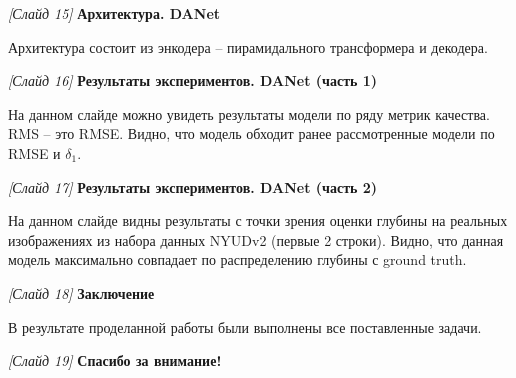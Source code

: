 \documentclass[a4paper, 14pt]{extarticle}
\begin{document}
	
	\textit{[Слайд 15]} \textbf{Архитектура. DANet}
	
	Архитектура состоит из энкодера -- пирамидального трансформера и декодера.
	\bigskip
	
	
	\textit{[Слайд 16]} \textbf{Результаты экспериментов. DANet (часть 1)}
	
	На данном слайде можно увидеть результаты модели по ряду метрик качества. RMS -- это RMSE. Видно, что модель обходит ранее рассмотренные модели по RMSE и $\delta_1$.
	\bigskip
	
	
	\textit{[Слайд 17]} \textbf{Результаты экспериментов. DANet (часть 2)}
	
	На данном слайде видны результаты с точки зрения оценки глубины на реальных изображениях из набора данных NYUDv2 (первые 2 строки). Видно, что данная модель максимально совпадает по распределению глубины с ground truth. 
	\bigskip
	
	
	\textit{[Слайд 18]} \textbf{Заключение}
	
	В результате проделанной работы были выполнены все поставленные задачи.
	\bigskip
	
	\textit{[Слайд 19]} \textbf{Спасибо за внимание!}
	
\end{document}
